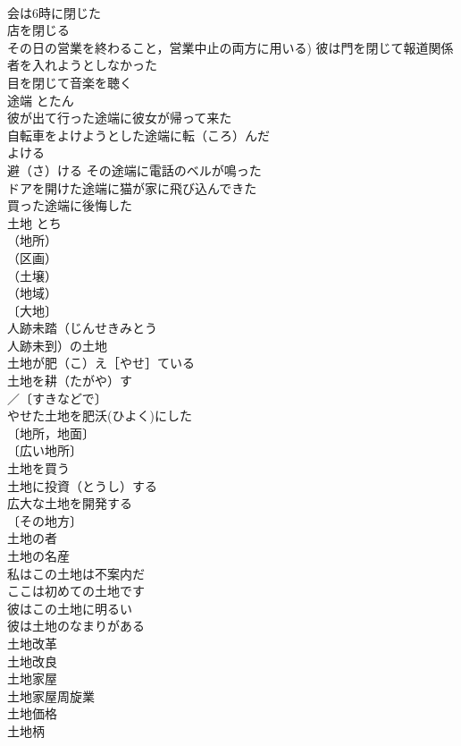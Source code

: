 \documentclass[8pt]{extreport}
\begin{document}
\begin{CJK}{UTF8}{min}
\\	会は6時に閉じた 
\\	店を閉じる 
\\	その日の営業を終わること，営業中止の両方に用いる) 彼は門を閉じて報道関係者を入れようとしなかった 
\\	目を閉じて音楽を聴く 
\\	途端	とたん	
\\	彼が出て行った途端に彼女が帰って来た 
\\	自転車をよけようとした途端に転（ころ）んだ 
\\	よける　
\\	避（さ）ける その途端に電話のベルが鳴った 
\\	ドアを開けた途端に猫が家に飛び込んできた 
\\	買った途端に後悔した 
\\	土地	とち	
\\	（地所）
\\	（区画）
\\	（土壌）
\\	（地域）
\\	〔大地〕
\\	人跡未踏（じんせきみとう　
\\	人跡未到）の土地 
\\	土地が肥（こ）え［やせ］ている 
\\	土地を耕（たがや）す 
\\	／〔すきなどで〕
\\	やせた土地を肥沃(ひよく)にした 
\\	〔地所，地面〕
\\	〔広い地所〕
\\	土地を買う 
\\	土地に投資（とうし）する 
\\	広大な土地を開発する 
\\	〔その地方〕
\\	土地の者 
\\	土地の名産 
\\	私はこの土地は不案内だ 
\\	ここは初めての土地です 
\\	彼はこの土地に明るい 
\\	彼は土地のなまりがある 
\\	土地改革 
\\	土地改良 
\\	土地家屋 
\\	土地家屋周旋業 
\\	土地価格 
\\	土地柄 

\end{CJK}
\end{document}
